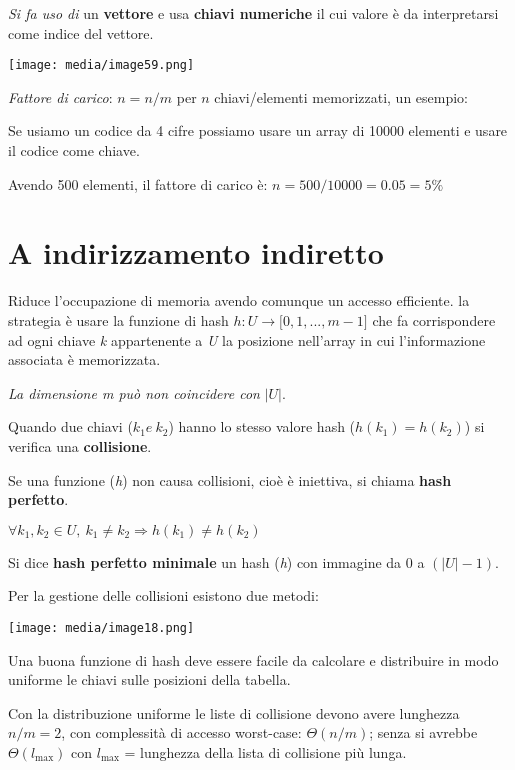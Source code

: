 \emph{Si fa uso di} un \textbf{vettore} e usa \textbf{chiavi numeriche}
il cui valore è da interpretarsi come indice del vettore.

\texttt{[image: media/image59.png]}

\emph{Fattore di carico}: \(n = n/m\) per \(n\) chiavi/elementi
memorizzati, un esempio:

Se usiamo un codice da 4 cifre possiamo usare un array di 10000 elementi
e usare il codice come chiave.

Avendo 500 elementi, il fattore di carico è:
\(n = 500/10000 = 0.05 = 5\%\)

\section{A indirizzamento indiretto}\label{a-indirizzamento-indiretto}

Riduce l'occupazione di memoria avendo comunque un accesso efficiente.
la strategia è usare la funzione di hash
\(h:U \rightarrow \lbrack 0,1,...,m - 1\rbrack\) che fa corrispondere ad
ogni chiave \emph{k} appartenente a \emph{U} la posizione nell'array in
cui l'informazione associata è memorizzata.

\emph{La dimensione m può non coincidere con} \(|U|.\)

Quando due chiavi (\(k_{1}e{\ k}_{2}\)) hanno lo stesso valore hash
(\(h(k_{1}) = h(k_{2})\)) si verifica una \textbf{collisione}.

Se una funzione (\emph{h}) non causa collisioni, cioè è iniettiva, si
chiama \textbf{hash perfetto}.

\(\forall k_{1},k_{2} \in U,\ k_{1} \neq k_{2} \Rightarrow h(k_{1}) \neq h(k_{2})\)

Si dice \textbf{hash perfetto minimale} un hash (\emph{h}) con immagine
da 0 a \((|U| - 1)\).

Per la gestione delle collisioni esistono due metodi:

\texttt{[image: media/image18.png]}

Una buona funzione di hash deve essere facile da calcolare e distribuire
in modo uniforme le chiavi sulle posizioni della tabella.

Con la distribuzione uniforme le liste di collisione devono avere
lunghezza \(n/m = 2\), con complessità di accesso worst-case:
\(\Theta(n/m)\); senza si avrebbe \(\Theta(l_{\max})\) con \(l_{\max}\)
= lunghezza della lista di collisione più lunga.

